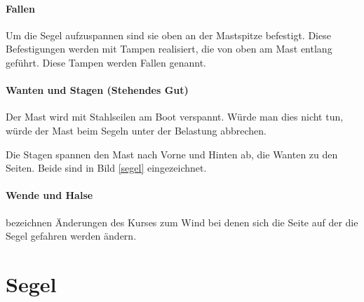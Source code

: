 \documentclass[12pt]{article}
\begin{document}
\paragraph{Fallen}
Um die Segel aufzuspannen sind sie oben an der Mastspitze befestigt. Diese Befestigungen werden mit Tampen realisiert, die von oben am Mast entlang geführt. Diese Tampen werden Fallen genannt.

\paragraph{Wanten und Stagen (Stehendes Gut)}
Der Mast wird mit Stahlseilen am Boot verspannt. Würde man dies nicht tun, würde der Mast beim Segeln unter der Belastung abbrechen.

Die Stagen spannen den Mast nach Vorne und Hinten ab, die Wanten zu den Seiten. Beide sind in Bild \ref{segel} eingezeichnet.

\paragraph{Wende und Halse}
bezeichnen Änderungen des Kurses zum Wind bei denen sich die Seite auf der die Segel gefahren werden ändern.

\section{Segel}
\end{document}
